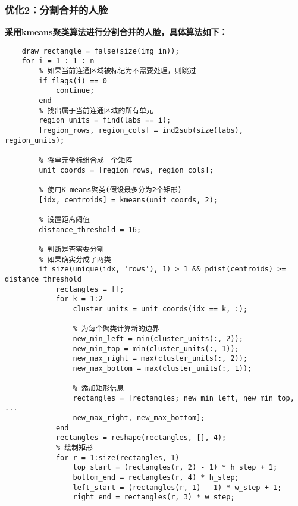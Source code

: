 \documentclass[12pt]{article}
\begin{document}
\subsubsection{优化2：分割合并的人脸}
\textbf{采用kmeans聚类算法进行分割合并的人脸，具体算法如下：}
\begin{lstlisting}
    draw_rectangle = false(size(img_in));
    for i = 1 : 1 : n
        % 如果当前连通区域被标记为不需要处理，则跳过
        if flags(i) == 0
            continue;
        end
        % 找出属于当前连通区域的所有单元
        region_units = find(labs == i);
        [region_rows, region_cols] = ind2sub(size(labs), region_units);

        % 将单元坐标组合成一个矩阵
        unit_coords = [region_rows, region_cols];
        
        % 使用K-means聚类(假设最多分为2个矩形)
        [idx, centroids] = kmeans(unit_coords, 2);

        % 设置距离阈值
        distance_threshold = 16;
        
        % 判断是否需要分割
        % 如果确实分成了两类
        if size(unique(idx, 'rows'), 1) > 1 && pdist(centroids) >= distance_threshold
            rectangles = [];
            for k = 1:2
                cluster_units = unit_coords(idx == k, :);
                
                % 为每个聚类计算新的边界
                new_min_left = min(cluster_units(:, 2));
                new_min_top = min(cluster_units(:, 1));
                new_max_right = max(cluster_units(:, 2));
                new_max_bottom = max(cluster_units(:, 1));
                
                % 添加矩形信息
                rectangles = [rectangles; new_min_left, new_min_top, ...
                new_max_right, new_max_bottom];
            end
            rectangles = reshape(rectangles, [], 4);
            % 绘制矩形
            for r = 1:size(rectangles, 1)
                top_start = (rectangles(r, 2) - 1) * h_step + 1;
                bottom_end = rectangles(r, 4) * h_step;
                left_start = (rectangles(r, 1) - 1) * w_step + 1;
                right_end = rectangles(r, 3) * w_step;
                

\end{lstlisting}
\end{document}
